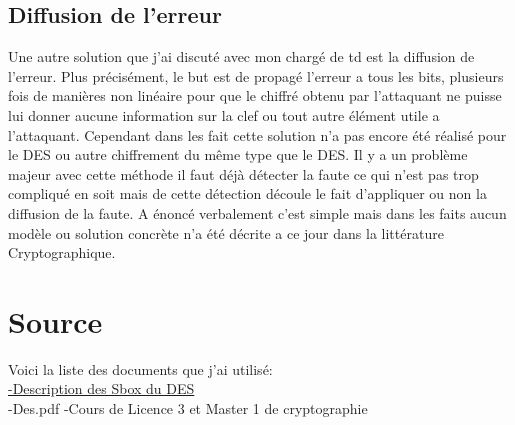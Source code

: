 \documentclass[a4paper]{report}
\begin{document}
			\section{Diffusion de l'erreur}
				Une autre solution que j'ai discuté avec mon chargé de td est la diffusion de l'erreur. Plus précisément, le but est de propagé l'erreur a tous les bits, plusieurs fois de manières non linéaire pour que le chiffré obtenu par l'attaquant ne puisse lui donner aucune information sur la clef ou tout autre élément utile a l'attaquant.
				Cependant dans les fait cette solution n'a pas encore été réalisé pour le DES ou autre chiffrement du même type que le DES. Il y a un problème majeur avec cette méthode il faut déjà détecter la faute ce qui n'est pas trop compliqué en soit mais de cette détection découle le fait d'appliquer ou non la diffusion de la faute. A énoncé verbalement c'est simple mais dans les faits aucun modèle ou solution concrète n'a été décrite a ce jour dans la littérature Cryptographique.
		
		\chapter{Source}
		Voici la liste des documents que j'ai utilisé:\\
		\href{https://fr.wikipedia.org/wiki/Constantes_du_DES}{-Description des Sbox du DES}\\
		-Des.pdf
		-Cours de Licence 3 et Master 1 de cryptographie
		

		
\end{document}
